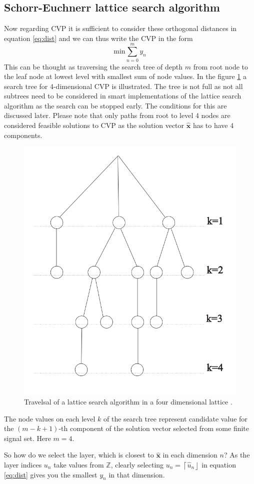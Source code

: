 \documentclass[english,12pt,a4paper,pdftex,sci,utf8]{aaltothesis}
\begin{document}
\subsection{Schorr-Euchnerr lattice search algorithm}
Now regarding CVP it is sufficient to consider these orthogonal distances in equation \eqref{eq:dist} and we can thus write the CVP in the form
\begin{equation}
\text{min} \sum_{n = 0}^{m} y_n
\label{eq:cvp}
\end{equation}
This can be thought as traversing the search tree of depth $m$ from root node to the leaf node at lowest level with smallest sum of node values. In the figure \ref{fig:tree} a search tree for 4-dimensional CVP is illustrated. The tree is not full as not all subtrees need to be considered in smart implementations of the lattice search algorithm as the search can be stopped early. The conditions for this are discussed later. Please note that only paths from root to level 4 nodes are considered feasible solutions to CVP as the solution vector $\mathbf{\hat{x}}$ has to have 4 components.
\begin{figure}[ht] 
  \centering
  \includegraphics[width=0.5\linewidth]{search-tree}
  \caption{Travelsal of a lattice search algorithm in a four dimensional lattice \cite{mia}.}
  \label{fig:tree}
\end{figure}
The node values on each level $k$ of the search tree represent candidate value for the $(m-k+1)$-th component of the solution vector selected from some finite signal set. Here $m = 4$.
\par So how do we select the layer, which is closest to $\mathbf{\hat{x}}$ in each dimension $n$? As the layer indices $u_n$ take values from $\mathbb{Z}$, clearly selecting $u_n = \left\lceil\hat{u}_n\right\rfloor$ in equation \eqref{eq:dist} gives you the smallest $y_n$ in that dimension. 
\end{document}
